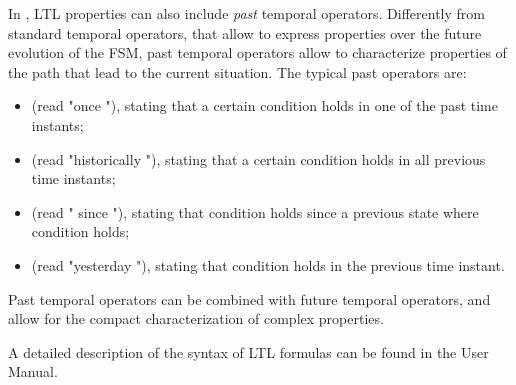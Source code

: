 In \nusmv, LTL properties can also include \emph{past} temporal
operators. Differently from standard temporal operators, that allow to
express properties over the future evolution of the FSM, past temporal
operators allow to characterize properties of the path that lead to the
current situation. The typical past operators are:
\begin{itemize}
\item {} (read "once "), 
stating that a certain condition  holds in one of the past
time instants;
\item {} (read "historically "), 
stating that a certain condition  holds in all previous time instants;
\item {} (read " since "),
stating that condition  holds since a previous state where
condition  holds;
\item {} (read "yesterday "),
stating that condition  holds in the previous time instant.
\end{itemize}
\noindent
Past temporal operators can be combined with future temporal operators,
and allow for the compact characterization of complex properties.

A detailed description of the syntax of LTL formulas can be 
found in the \NuSMV User Manual.
